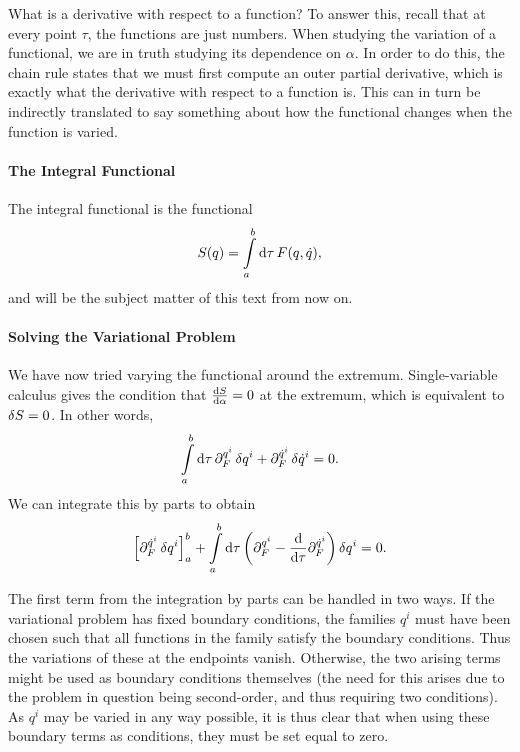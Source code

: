 What is a derivative with respect to a function? To answer this, recall that at every point $\tau$, the functions are just numbers. When studying the variation of a functional, we are in truth studying its dependence on $\alpha$. In order to do this, the chain rule states that we must first compute an outer partial derivative, which is exactly what the derivative with respect to a function is. This can in turn be indirectly translated to say something about how the functional changes when the function is varied.

\paragraph{The Integral Functional}
The integral functional is the functional
\begin{align*}
	S(q) = \int\limits_{a}^{b}\dd{\tau}{F(q, \dot{q})},
\end{align*}
and will be the subject matter of this text from now on.

\paragraph{Solving the Variational Problem}
We have now tried varying the functional around the extremum. Single-variable calculus gives the condition that $\dv{S}{\alpha} = 0$ at the extremum, which is equivalent to $\var{S} = 0$. In other words,
\begin{align*}
	\int\limits_{a}^{b}\dd{\tau}{\ensuremath{\partial^{q^{i}}_{F}}\var{q^{i}} + \ensuremath{\partial^{\dot{q}^{i}}_{F}}\var{\dot{q}^{i}}} = 0.
\end{align*}
We can integrate this by parts to obtain
\begin{align*}
	\left[\partial^{\dot{q}^{i}}_{F}\var{q^{i}}\right]_{a}^{b} + \int\limits_{a}^{b}\dd{\tau}{\left(\ensuremath{\partial^{q^{i}}_{F}} - \dv{\tau}\ensuremath{\partial^{\dot{q}^{i}}_{F}}\right)\var{q^{i}}} = 0.
\end{align*}

The first term from the integration by parts can be handled in two ways. If the variational problem has fixed boundary conditions, the families $q^{i}$ must have been chosen such that all functions in the family satisfy the boundary conditions. Thus the variations of these at the endpoints vanish. Otherwise, the two arising terms might be used as boundary conditions themselves (the need for this arises due to the problem in question being second-order, and thus requiring two conditions). As $q^{i}$ may be varied in any way possible, it is thus clear that when using these boundary terms as conditions, they must be set equal to zero.

